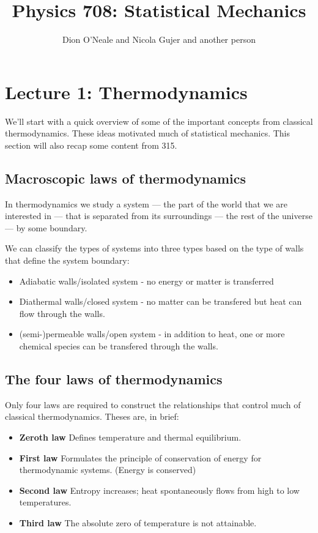 \documentclass{article}
\title{Physics 708: Statistical Mechanics}
\author{Dion O'Neale 
	and Nicola Gujer
	and another person}
\begin{document}
\maketitle
\section{Lecture 1: Thermodynamics}
We'll start with a quick overview of some of the important concepts from classical thermodynamics. These ideas motivated much of statistical mechanics. This section will also recap some content from 315. 

\subsection*{Macroscopic laws of thermodynamics}
In thermodynamics we study a system --- the part of the world that we are interested in --- that is separated from its surroundings --- the rest of the universe --- by some boundary.

We can classify the types of systems into three types based on the type of walls that define the system boundary:
\begin{itemize}
\item Adiabatic walls/isolated system - no energy or matter is transferred
\item Diathermal walls/closed system - no matter can be transfered but heat can flow through the walls.
\item (semi-)permeable walls/open system - in addition to heat, one or more chemical species can be transfered through the walls. 
\end{itemize}

\subsection*{The four laws of thermodynamics}
Only four laws are required to construct the relationships that control much of classical thermodynamics. Theses are, in brief:
\begin{itemize}
\item {\bf Zeroth law} Defines temperature and thermal equilibrium.
\item {\bf First law} Formulates the principle of conservation of energy for thermodynamic systems. (Energy is conserved)
\item {\bf Second law} Entropy increases; heat spontaneously flows from high to low temperatures.
\item {\bf Third law} The absolute zero of temperature is not attainable.  
\end{itemize}
\end{document}
